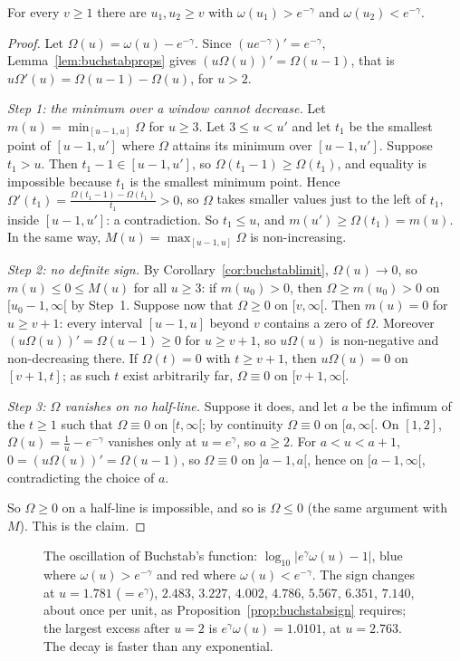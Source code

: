 \begin{proposition}\label{prop:buchstabsign}
For every $v\ge1$ there are $u_1,u_2\ge v$ with $\omega(u_1)>e^{-\gamma}$ and $\omega(u_2)<e^{-\gamma}$.
\end{proposition}
\begin{proof}
Let $\Omega(u)=\omega(u)-e^{-\gamma}$. Since $(ue^{-\gamma})'=e^{-\gamma}$, Lemma~\ref{lem:buchstabprops} gives $(u\Omega(u))'=\Omega(u-1)$, that is $u\Omega'(u)=\Omega(u-1)-\Omega(u)$, for $u>2$.

\emph{Step 1: the minimum over a window cannot decrease.} Let $m(u)=\min_{[u-1,u]}\Omega$ for $u\ge3$. Let $3\le u<u'$ and let $t_1$ be the smallest point of $[u-1,u']$ where $\Omega$ attains its minimum over $[u-1,u']$. Suppose $t_1>u$. Then $t_1-1\in[u-1,u']$, so $\Omega(t_1-1)\ge\Omega(t_1)$, and equality is impossible because $t_1$ is the smallest minimum point. Hence $\Omega'(t_1)=\frac{\Omega(t_1-1)-\Omega(t_1)}{t_1}>0$, so $\Omega$ takes smaller values just to the left of $t_1$, inside $[u-1,u']$: a contradiction. So $t_1\le u$, and $m(u')\ge\Omega(t_1)=m(u)$. In the same way, $M(u)=\max_{[u-1,u]}\Omega$ is non-increasing.

\emph{Step 2: no definite sign.} By Corollary~\ref{cor:buchstablimit}, $\Omega(u)\to0$, so $m(u)\le0\le M(u)$ for all $u\ge3$: if $m(u_0)>0$, then $\Omega\ge m(u_0)>0$ on $[u_0-1,\infty[$ by Step~1. Suppose now that $\Omega\ge0$ on $[v,\infty[$. Then $m(u)=0$ for $u\ge v+1$: every interval $[u-1,u]$ beyond $v$ contains a zero of $\Omega$. Moreover $(u\Omega(u))'=\Omega(u-1)\ge0$ for $u\ge v+1$, so $u\Omega(u)$ is non-negative and non-decreasing there. If $\Omega(t)=0$ with $t\ge v+1$, then $u\Omega(u)=0$ on $[v+1,t]$; as such $t$ exist arbitrarily far, $\Omega\equiv0$ on $[v+1,\infty[$.

\emph{Step 3: $\Omega$ vanishes on no half-line.} Suppose it does, and let $a$ be the infimum of the $t\ge1$ such that $\Omega\equiv0$ on $[t,\infty[$; by continuity $\Omega\equiv0$ on $[a,\infty[$. On $[1,2]$, $\Omega(u)=\frac1u-e^{-\gamma}$ vanishes only at $u=e^\gamma$, so $a\ge2$. For $a<u<a+1$, $0=(u\Omega(u))'=\Omega(u-1)$, so $\Omega\equiv0$ on $]a-1,a[$, hence on $[a-1,\infty[$, contradicting the choice of $a$.

So $\Omega\ge0$ on a half-line is impossible, and so is $\Omega\le0$ (the same argument with $M$). This is the claim.
\end{proof}

\begin{figure}[ht]
\centering{}
\caption{The oscillation of Buchstab's function: $\log_{10}|e^\gamma\omega(u)-1|$, blue where $\omega(u)>e^{-\gamma}$ and red where $\omega(u)<e^{-\gamma}$. The sign changes at $u=1.781$ ($=e^\gamma$), $2.483$, $3.227$, $4.002$, $4.786$, $5.567$, $6.351$, $7.140$, about once per unit, as Proposition~\ref{prop:buchstabsign} requires; the largest excess after $u=2$ is $e^\gamma\omega(u)=1.0101$, at $u=2.763$. The decay is faster than any exponential.}
\label{fig:buchstab}
\end{figure}

